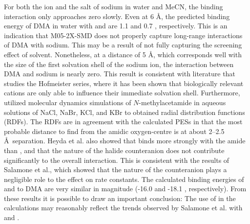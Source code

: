\begin{doublespace}
For both the ion and the salt of sodium in water and MeCN, the binding
interaction only approaches zero slowly. Even at 6 \AA, the predicted binding
energy of DMA in water with  and  are 1.1 and 0.7 \kcalmol,
respectively. This is an indication that M05-2X-SMD does not properly capture
long-range interactions of DMA with sodium. This may be a result of not fully
capturing the screening effect of solvent. Nonetheless, at a distance of 5 \AA,
which corresponds well with the size of the first solvation shell of the sodium
ion,\cite{Degreve1996} the interaction between DMA and sodium is nearly zero.
This result is consistent with literature that studies the Hofmeister series,
where it has been shown that biologically relevant cations are only able to
influence their immediate solvation shell.\cite{Omta2003, Funkner2011}
Furthermore, \citet{Heyda2009} utilized molecular dynamics simulations of
$N$-methylacetamide in aqueous solutions of NaCl, NaBr, KCl, and KBr to obtained
radial distribution functions (RDFs). The RDFs are in agreement with the
calculated PESs in that the most probable distance to find  from the
amidic oxygen-centre is at about 2--2.5 \AA\ separation. Heyda et al. also
showed that  binds more strongly with the amide than , and that
the nature of the halide counteranion does not contribute significantly to the
overall interaction. This is consistent with the results of Salamone et al.,
which showed that the nature of the counteranion plays a negligible role to the
effect on rate constants.\cite{Salamone2013a} The calculated binding energies of
 and  to DMA are very similar in magnitude (-16.0 and -18.1
\kcalmol, respectively). From these results it is possible to draw an important
conclusion: The use of  in the calculations may reasonably reflect the
trends observed by Salamone et al.  with  and .


\end{doublespace}
